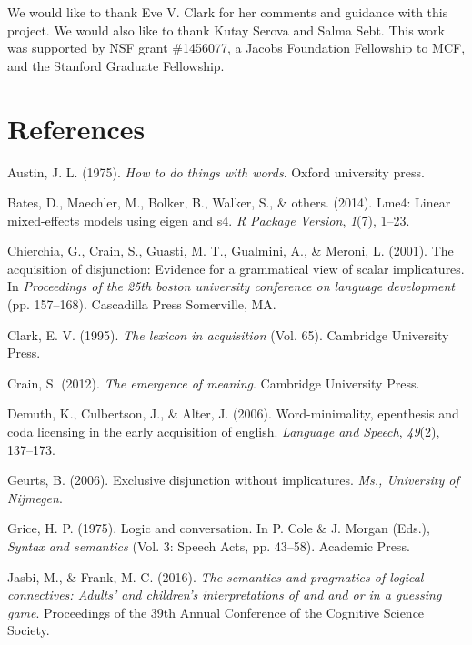 \documentclass[10pt, letterpaper]{article}
\begin{document}
We would like to thank Eve V. Clark for her comments and guidance with
this project. We would also like to thank Kutay Serova and Salma Sebt.
This work was supported by NSF grant \#1456077, a Jacobs Foundation
Fellowship to MCF, and the Stanford Graduate Fellowship.

\section{References}\label{references}

\setlength{\parindent}{-0.1in} \setlength{\leftskip}{0.125in} \noindent

\hypertarget{refs}{}
\hypertarget{ref-austin1975things}{}
Austin, J. L. (1975). \emph{How to do things with words}. Oxford
university press.

\hypertarget{ref-bates2014lme4}{}
Bates, D., Maechler, M., Bolker, B., Walker, S., \& others. (2014).
Lme4: Linear mixed-effects models using eigen and s4. \emph{R Package
Version}, \emph{1}(7), 1--23.

\hypertarget{ref-chierchia2001acquisition}{}
Chierchia, G., Crain, S., Guasti, M. T., Gualmini, A., \& Meroni, L.
(2001). The acquisition of disjunction: Evidence for a grammatical view
of scalar implicatures. In \emph{Proceedings of the 25th boston
university conference on language development} (pp. 157--168).
Cascadilla Press Somerville, MA.

\hypertarget{ref-clark1995lexicon}{}
Clark, E. V. (1995). \emph{The lexicon in acquisition} (Vol. 65).
Cambridge University Press.

\hypertarget{ref-crain2012emergence}{}
Crain, S. (2012). \emph{The emergence of meaning}. Cambridge University
Press.

\hypertarget{ref-demuth2006word}{}
Demuth, K., Culbertson, J., \& Alter, J. (2006). Word-minimality,
epenthesis and coda licensing in the early acquisition of english.
\emph{Language and Speech}, \emph{49}(2), 137--173.

\hypertarget{ref-geurts2006exclusive}{}
Geurts, B. (2006). Exclusive disjunction without implicatures.
\emph{Ms., University of Nijmegen}.

\hypertarget{ref-grice1975logicconvo}{}
Grice, H. P. (1975). Logic and conversation. In P. Cole \& J. Morgan
(Eds.), \emph{Syntax and semantics} (Vol. 3: Speech Acts, pp. 43--58).
Academic Press.

\hypertarget{ref-jasbi2016cogsci}{}
Jasbi, M., \& Frank, M. C. (2016). \emph{The semantics and pragmatics of
logical connectives: Adults' and children's interpretations of and and
or in a guessing game}. Proceedings of the 39th Annual Conference of the
Cognitive Science Society.
\end{document}

